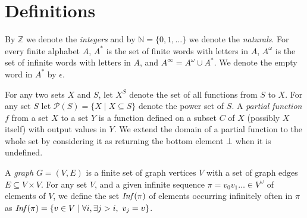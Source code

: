 \documentclass[a4paper,UKenglish,cleveref, autoref, thm-restate]{lipics-v2021}
\newcommand{\Z}{\mathbb{Z}}
\newcommand{\N}{\mathbb{N}}
\newcommand{\MSO}{\textsc{MSO}}
\begin{document}
\section{Definitions}


\newcommand{\LCM}{\mathsf{LCM}}
\newcommand{\LOGSPACE}{\mathsf{LOGSPACE}}
\renewcommand{\MSO}{\mathsf{MSO}}
\newcommand{\SO}{\mathsf{SO}}

By $\Z $ we denote the {\em integers} and by $\N=\{0,1,\ldots\}$ we denote the {\em naturals}.
For every finite alphabet $A$, $A^*$ is the set of finite
words with letters in  $A$, $A^\omega$ is the set of infinite words with letters in $A$, and
 $A^\infty = A^\omega \cup A^*$. We denote the empty word in $A^*$ by $\epsilon$.
%

 For any two sets $X$ and $S$, let $X^S$ denote the set of all functions from $S$ to $X$.
For any set $S$ let 
$\mathcal{P}(S) = \{ X \mid X \subseteq S \}$
denote the power set of $S$.
%
A {\em partial function} $f$ from a set $X$ to a set $Y$ is a function defined on a subset $C$ of $X$ (possibly $X$ itself) with output values in $Y$. We extend the domain of a partial function to the whole set
by considering it as returning the bottom element $\bot$ when it is undefined.




A {\em graph} $G=(V,E)$ is a finite set of graph vertices $V$ with a set of graph edges $E \subseteq V \times V$. 
%
For any set $V$, and a given infinite sequence $\pi = v_0 v_1 \ldots \in V^\omega$ of elements of $V$, we define the set 
$\text{\textit{Inf}}(\pi)$ of elements occurring infinitely often in $\pi$ as
$\text{\textit{Inf}}(\pi) = \{ v \in V \mid \forall i, \exists j > i, ~ v_j = v \}$. 
\end{document}
